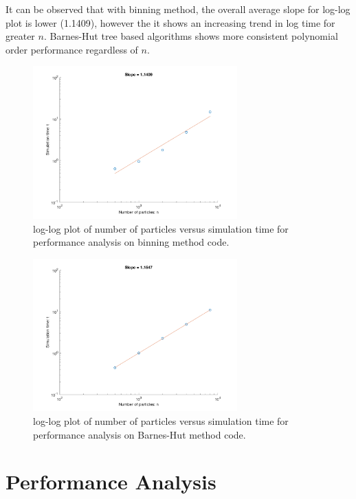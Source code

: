\documentclass{article}
\begin{document}
It can be observed that with binning method, the overall average slope for
log-log plot is lower (1.1409), however the it shows an increasing trend in log
time for greater $n$. Barnes-Hut tree based algorithms shows more consistent
polynomial order performance regardless of $n$.

\begin{figure}[h!]
\centering
\includegraphics[width=0.7\textwidth]{Picture4.png}
\caption{log-log plot of number of particles versus simulation time for
performance analysis on binning method code.}\label{fig:loglogbin}
\end{figure}
\begin{figure}[h!]
\centering
\includegraphics[width=0.7\textwidth]{Picture5.png}
\caption{log-log plot of number of particles versus simulation time for
performance analysis on Barnes-Hut method code.}\label{fig:loglogBH}
\end{figure}

\section{Performance Analysis}\label{section:vtune}
\end{document}
